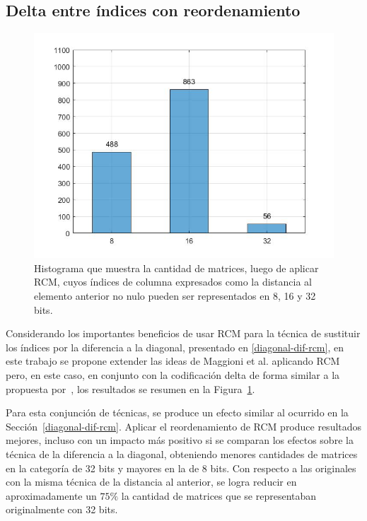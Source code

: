 \subsection{Delta entre índices con reordenamiento}\label{delta-rcm}

\begin{figure}
  \centering
  \includegraphics[width=.6\textwidth]{imagenes/chap4/hist_delta_dist_cat_rcm.jpg}
  \caption{%
   Histograma que muestra la cantidad de matrices, luego de aplicar RCM, cuyos índices de columna expresados como la distancia al elemento anterior no nulo pueden ser representados en 8, 16 y 32 bits.
  }
  \label{fig:hist_delta_dist_cat_rcm}
\end{figure}%

Considerando los importantes beneficios de usar RCM para la técnica de sustituir los índices por la diferencia a la diagonal, presentado en \ref{diagonal-dif-rcm}, en este trabajo se propone extender las ideas de Maggioni et al. aplicando RCM pero, en este caso, en conjunto con la codificación delta de forma similar a la propuesta por~\cite{Tang2013}, los resultados se resumen en la Figura~\ref{fig:hist_delta_dist_cat_rcm}.

Para esta conjunción de técnicas, se produce un efecto similar al ocurrido en la Sección~\ref{diagonal-dif-rcm}. Aplicar el reordenamiento de RCM produce resultados mejores, incluso con un impacto más positivo si se comparan los efectos sobre la técnica de la diferencia a la diagonal, obteniendo menores cantidades de matrices en la categoría de 32 bits y mayores en la de 8 bits. Con respecto a las originales con la misma técnica de la distancia al anterior, se logra reducir en aproximadamente  un $75\%$ la cantidad de matrices que se representaban originalmente con 32 bits.


